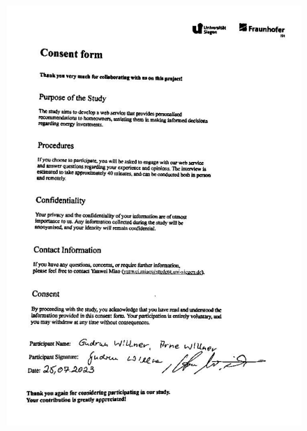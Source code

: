 \begin{figure}[h]
    \centering
    \includegraphics[width=\textwidth]{Images/consent_de.jpg}
\end{figure}

